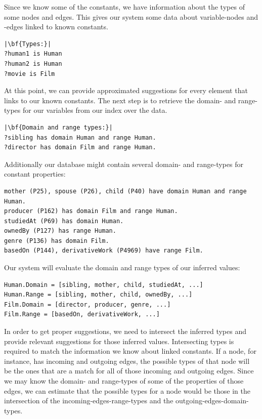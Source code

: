 Since we know some of the constants, we have information about the types of some nodes and edges. This gives our system some data about variable-nodes and -edges linked to known constants. 

\begin{verbatim}
|\bf{Types:}|
?human1 is Human
?human2 is Human
?movie is Film
\end{verbatim}

At this point, we can provide approximated suggestions for every element that links to our known constants. The next step is to retrieve the domain- and range-types for our variables from our index over the data. 

\begin{verbatim}
|\bf{Domain and range types:}|
?sibling has domain Human and range Human.
?director has domain Film and range Human.
\end{verbatim}

Additionally our database might contain several domain- and range-types for constant properties:

\begin{verbatim}
mother (P25), spouse (P26), child (P40) have domain Human and range Human.
producer (P162) has domain Film and range Human.
studiedAt (P69) has domain Human.
ownedBy (P127) has range Human.
genre (P136) has domain Film.
basedOn (P144), derivativeWork (P4969) have range Film.
\end{verbatim}

Our system will evaluate the domain and range types of our inferred values:
\begin{verbatim}
Human.Domain = [sibling, mother, child, studiedAt, ...]
Human.Range = [sibling, mother, child, ownedBy, ...]
Film.Domain = [director, producer, genre, ...]
Film.Range = [basedOn, derivativeWork, ...]
\end{verbatim}

In order to get proper suggestions, we need to intersect the inferred types and provide relevant suggestions for those inferred values. Intersecting types is required to match the information we know about linked constants. If a node, for instance, has incoming and outgoing edges, the possible types of that node will be the ones that are a match for all of those incoming and outgoing edges. Since we may know the domain- and range-types of some of the properties of those edges, we can estimate that the possible types for a node would be those in the intersection of the incoming-edges-range-types and the outgoing-edges-domain-types.


